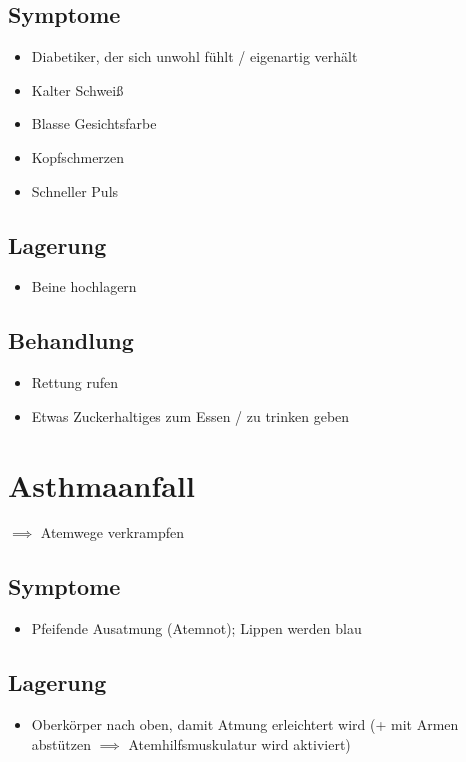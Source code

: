 \section*{Symptome}
\begin{itemize}
    \item Diabetiker, der sich unwohl fühlt / eigenartig verhält
    \item Kalter Schweiß
    \item Blasse Gesichtsfarbe
    \item Kopfschmerzen
    \item Schneller Puls
\end{itemize}

\section*{Lagerung}
\begin{itemize}
    \item Beine hochlagern
\end{itemize}

\section*{Behandlung}
\begin{itemize}
    \item Rettung rufen
    \item Etwas Zuckerhaltiges zum Essen / zu trinken geben
\end{itemize}

\chapter{Asthmaanfall}
$\implies$ Atemwege verkrampfen

\section*{Symptome}
\begin{itemize}
    \item Pfeifende Ausatmung (Atemnot); Lippen werden blau
\end{itemize}

\section*{Lagerung}
\begin{itemize}
    \item Oberkörper nach oben, damit Atmung erleichtert wird (+ mit Armen abstützen $\implies$ Atemhilfsmuskulatur wird aktiviert)
\end{itemize}

